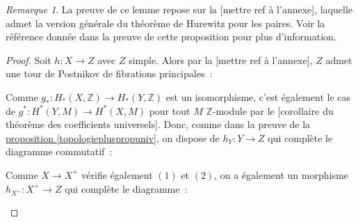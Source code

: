 \documentclass{amsart}
\newcommand{\sref}[2]{\hyperref[#2]{#1 \ref*{#2}}}
\theoremstyle{plain}
\theoremstyle{definition}
\theoremstyle{remark}
\newtheorem{rem}[theo]{Remarque}
\newcommand{\ensemblenombre }[1]{\mathbb{#1}}
\newcommand{\Z}{\ensemblenombre{Z}}
\newcommand{\ra}{\rightarrow}
\begin{document}
\begin{rem}
  La preuve de ce lemme repose sur la [mettre ref à l'annexe], laquelle admet la version générale du théorème de Hurewitz pour les paires.
  Voir la référence donnée dans la preuve de cette proposition pour plus d'information.
\end{rem}

\begin{proof}
  Soit $h:X\ra Z$ avec $Z$ simple. Alors par la [mettre ref à l'annexe], $Z$ admet une tour de Postnikov de fibrations principales~:
  \begin{center}
  \end{center}
  Comme $g_*:H_*(X,\Z)\ra H_*(Y,\Z)$ est un isomorphisme, c'est également le cas de $g^*:H^*(Y,M)\ra H^*(X,M)$ pour tout $M$ $\Z$-module
  par le [corollaire du théorème des coefficients universels]. Donc, comme dans la preuve de la \sref{proposition}{topologiepluspropuniv},
  on dispose de $h_Y:Y\ra Z$ qui complète le diagramme commutatif~:
  \begin{center}
  \end{center}
  Comme $X\ra X^+$ vérifie également $(1)$ et $(2)$, on a également un morphisme $h_{X^+}:X^+\ra Z$ qui complète le diagramme~:
  \begin{center}
\end{center}
\end{proof}
\end{document}
